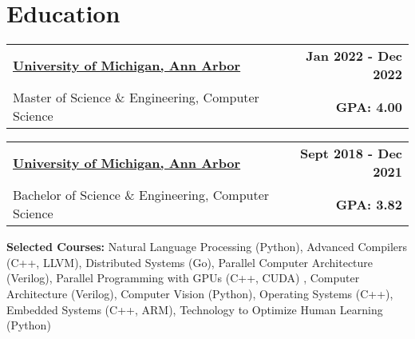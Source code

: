 \documentclass[10pt]{extreport}
\makeatletter
\newcommand{\resumeSubheading}[4]{
  \vspace{-1pt}
    \begin{tabular*}{1.0\textwidth}{l@{\extracolsep{\fill}}r}
      \textbf{#1} & \textbf{#2}  \vspace{1mm} \\
      {#3} & \textbf{#4} \\
    \end{tabular*}\vspace{-3pt}
}
\makeatother
\begin{document}


\vspace{-1.5mm}

\section{Education}
        \resumeSubheading{\underline{University of Michigan, Ann Arbor}} {Jan 2022 - Dec 2022}
      {Master of Science \& Engineering, Computer Science}{ GPA: 4.00}
     
      \vspace{2mm}
    \resumeSubheading{\underline{University of Michigan, Ann Arbor}}{Sept 2018 - Dec 2021}
      {Bachelor of Science \& Engineering, Computer Science}{GPA: 3.82}
            \vspace{2mm}

      {\textbf{Selected Courses:} Natural Language Processing (Python), Advanced Compilers (C++, LLVM), Distributed Systems (Go), Parallel Computer Architecture (Verilog), Parallel Programming with GPUs (C++, CUDA) , Computer Architecture (Verilog), Computer Vision (Python), Operating Systems (C++), Embedded Systems (C++, ARM), Technology to Optimize Human Learning (Python) }{}

\vspace{-1.5mm}
\vspace{-5pt}
\end{document}
